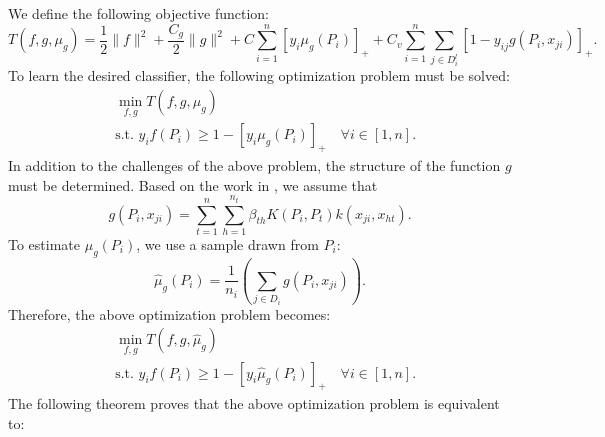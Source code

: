 \documentclass[12pt]{article}
\begin{document}
	We define the following objective function:
	\begin{equation}
		T(f, g, \mu_g) = \frac{1}{2}\|f\|^2 + \frac{C_g}{2}\|g\|^2 + C \sum_{i=1}^{n} \left[ y_i \mu_g(P_i) \right]_+ + C_v \sum_{i=1}^{n} \sum_{j \in D_i^l} \left[ 1 - y_{ij} g(P_i, x_{ji}) \right]_+.
	\end{equation}
	To learn the desired classifier, the following optimization problem must be solved:
	\begin{subequations}
		\label{eq:lupi-dist-opt}
		\begin{align}
			&\min_{f, g} T(f, g, \mu_g) \\
			&\text{s.t. } y_i f(P_i) \ge 1 - \left[ y_i \mu_g(P_i) \right]_+ \quad \forall i \in [1, n].
		\end{align}
	\end{subequations}
	In addition to the challenges of the above problem, the structure of the function $g$ must be determined. Based on the work in \cite{louizos2015learning}, we assume that
	\begin{equation}
		g(P_i, x_{ji}) = \sum_{t=1}^{n} \sum_{h=1}^{n_t} \beta_{th} K(P_i, P_t) k(x_{ji}, x_{ht}).
	\end{equation}
	To estimate $\mu_g(P_i)$, we use a sample drawn from $P_i$:
	\begin{equation}
		\hat{\mu}_g(P_i) = \frac{1}{n_i} \left( \sum_{j \in D_i} g(P_i, x_{ji}) \right).
	\end{equation}
	Therefore, the above optimization problem becomes:
	\begin{subequations}
		\label{eq:lupi-dist-opt-approx}
		\begin{align}
			&\min_{f, g} T(f, g, \hat{\mu}_g) \\
			&\text{s.t. } y_i f(P_i) \ge 1 - \left[ y_i \hat{\mu}_g(P_i) \right]_+ \quad \forall i \in [1, n].
		\end{align}
	\end{subequations}
	The following theorem proves that the above optimization problem is equivalent to:
	
\end{document}
